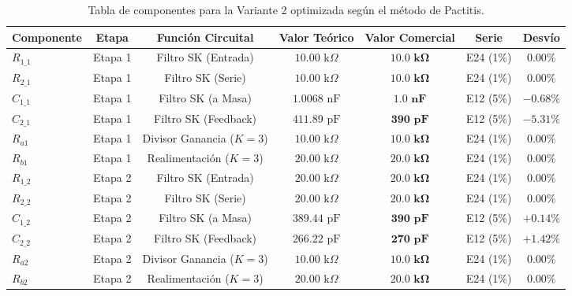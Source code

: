 \documentclass[a4paper,11pt]{article}
\begin{document}
\begin{table}[H]
\centering
\small
\setlength{\tabcolsep}{3.5pt}
\begin{tabular}{lcccccc}
\toprule
\textbf{Componente} & \textbf{Etapa} & \textbf{Función Circuital} & \textbf{Valor Teórico} & \textbf{Valor Comercial} & \textbf{Serie} & \textbf{Desvío} \\
\midrule
$R_{1\_1}$ & Etapa 1 & Filtro SK (Entrada) & $10.00\text{ k}\Omega$ & $\mathbf{10.0\text{ k}\Omega}$ & E24 (1\%) & $0.00\%$ \\
$R_{2\_1}$ & Etapa 1 & Filtro SK (Serie) & $10.00\text{ k}\Omega$ & $\mathbf{10.0\text{ k}\Omega}$ & E24 (1\%) & $0.00\%$ \\
$C_{1\_1}$ & Etapa 1 & Filtro SK (a Masa) & $1.0068\text{ nF}$ & $\mathbf{1.0\text{ nF}}$ & E12 (5\%) & $-0.68\%$ \\
$C_{2\_1}$ & Etapa 1 & Filtro SK (Feedback) & $411.89\text{ pF}$ & $\mathbf{390\text{ pF}}$ & E12 (5\%) & $-5.31\%$ \\
$R_{a1}$   & Etapa 1 & Divisor Ganancia ($K=3$) & $10.00\text{ k}\Omega$ & $\mathbf{10.0\text{ k}\Omega}$ & E24 (1\%) & $0.00\%$ \\
$R_{b1}$   & Etapa 1 & Realimentación ($K=3$) & $20.00\text{ k}\Omega$ & $\mathbf{20.0\text{ k}\Omega}$ & E24 (1\%) & $0.00\%$ \\
\midrule
$R_{1\_2}$ & Etapa 2 & Filtro SK (Entrada) & $20.00\text{ k}\Omega$ & $\mathbf{20.0\text{ k}\Omega}$ & E24 (1\%) & $0.00\%$ \\
$R_{2\_2}$ & Etapa 2 & Filtro SK (Serie) & $20.00\text{ k}\Omega$ & $\mathbf{20.0\text{ k}\Omega}$ & E24 (1\%) & $0.00\%$ \\
$C_{1\_2}$ & Etapa 2 & Filtro SK (a Masa) & $389.44\text{ pF}$ & $\mathbf{390\text{ pF}}$ & E12 (5\%) & $+0.14\%$ \\
$C_{2\_2}$ & Etapa 2 & Filtro SK (Feedback) & $266.22\text{ pF}$ & $\mathbf{270\text{ pF}}$ & E12 (5\%) & $+1.42\%$ \\
$R_{a2}$   & Etapa 2 & Divisor Ganancia ($K=3$) & $10.00\text{ k}\Omega$ & $\mathbf{10.0\text{ k}\Omega}$ & E24 (1\%) & $0.00\%$ \\
$R_{b2}$   & Etapa 2 & Realimentación ($K=3$) & $20.00\text{ k}\Omega$ & $\mathbf{20.0\text{ k}\Omega}$ & E24 (1\%) & $0.00\%$ \\
\bottomrule
\end{tabular}
\caption{Tabla de componentes para la Variante 2 optimizada según el método de Pactitis.}
\label{tab:componentes_v2}
\end{table}
\end{document}
